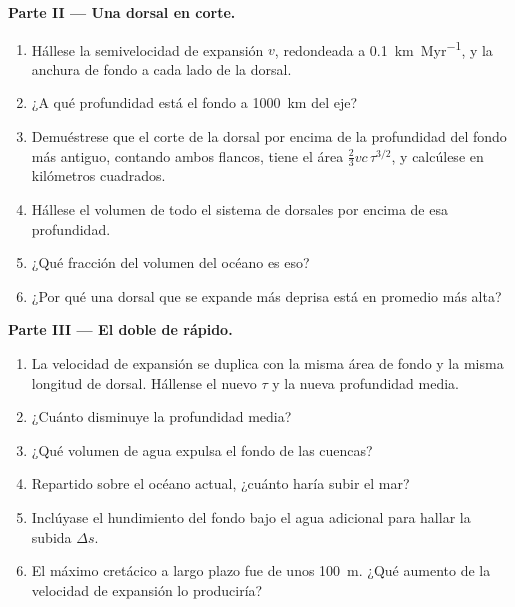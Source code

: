 \begin{problem}
\noindent\textbf{Parte II --- Una dorsal en corte.}
\begin{enumerate}[resume]
  \item Hállese la semivelocidad de expansión $v$, redondeada a \qty{0.1}{km.Myr^{-1}}, y la anchura
        de fondo a cada lado de la dorsal.
  \item ¿A qué profundidad está el fondo a \qty{1000}{km} del eje?
  \item Demuéstrese que el corte de la dorsal por encima de la profundidad del fondo más antiguo, contando
        ambos flancos, tiene el área $\tfrac23 v c\,\tau^{3/2}$, y calcúlese en
        kilómetros cuadrados.
  \item Hállese el volumen de todo el sistema de dorsales por encima de esa profundidad.
  \item ¿Qué fracción del volumen del océano es eso?
  \item ¿Por qué una dorsal que se expande más deprisa está en promedio más alta?
\end{enumerate}

\noindent\textbf{Parte III --- El doble de rápido.}
\begin{enumerate}[resume]
  \item La velocidad de expansión se duplica con la misma área de fondo y la misma longitud de dorsal. Hállense el nuevo $\tau$
        y la nueva profundidad media.
  \item ¿Cuánto disminuye la profundidad media?
  \item ¿Qué volumen de agua expulsa el fondo de las cuencas?
  \item Repartido sobre el océano actual, ¿cuánto haría subir el mar?
  \item Inclúyase el hundimiento del fondo bajo el agua adicional para hallar la subida $\Delta s$.
  \item El máximo cretácico a largo plazo fue de unos \qty{100}{m}. ¿Qué aumento de la velocidad de expansión
        lo produciría?
\end{enumerate}


\end{problem}
